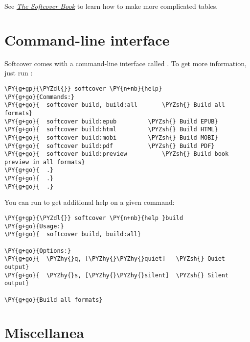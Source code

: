 See \href{http://manual.softcover.io/book/softcover_markdown#sec-embedded_tabular_and_tables}{\emph{The Softcover Book}} to learn how to make more complicated tables.

\section{Command-line interface}

Softcover comes with a command-line interface called . To get more information, just run :

\begin{framed_shaded}
\begin{Verbatim}[fontsize=\relsize{-2.5},fontseries=b,commandchars=\\\{\}]
\PY{g+gp}{\PYZdl{}} softcover \PY{n+nb}{help}
\PY{g+go}{Commands:}
\PY{g+go}{  softcover build, build:all       \PYZsh{} Build all formats}
\PY{g+go}{  softcover build:epub         \PYZsh{} Build EPUB}
\PY{g+go}{  softcover build:html         \PYZsh{} Build HTML}
\PY{g+go}{  softcover build:mobi         \PYZsh{} Build MOBI}
\PY{g+go}{  softcover build:pdf          \PYZsh{} Build PDF}
\PY{g+go}{  softcover build:preview          \PYZsh{} Build book preview in all formats}
\PY{g+go}{  .}
\PY{g+go}{  .}
\PY{g+go}{  .}
\end{Verbatim}
\end{framed_shaded}

\noindent You can run  to get additional help on a given command:

\begin{framed_shaded}
\begin{Verbatim}[fontsize=\relsize{-2.5},fontseries=b,commandchars=\\\{\}]
\PY{g+gp}{\PYZdl{}} softcover \PY{n+nb}{help }build
\PY{g+go}{Usage:}
\PY{g+go}{  softcover build, build:all}

\PY{g+go}{Options:}
\PY{g+go}{  \PYZhy{}q, [\PYZhy{}\PYZhy{}quiet]   \PYZsh{} Quiet output}
\PY{g+go}{  \PYZhy{}s, [\PYZhy{}\PYZhy{}silent]  \PYZsh{} Silent output}

\PY{g+go}{Build all formats}
\end{Verbatim}
\end{framed_shaded}

\section{Miscellanea}

